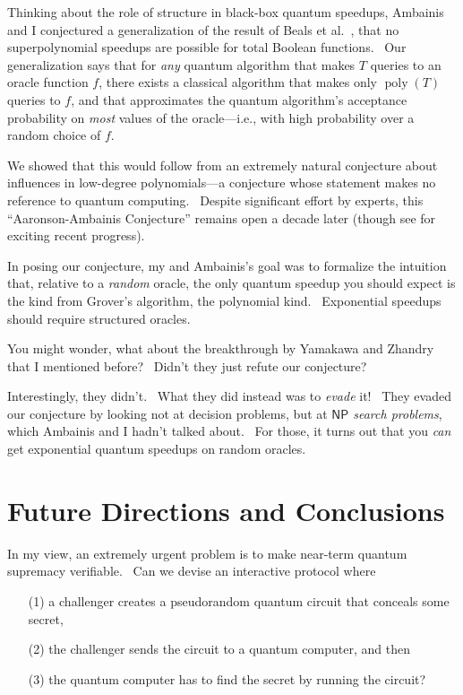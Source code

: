 \documentclass[11pt]{article}
\begin{document}
Thinking about the role of structure in black-box quantum speedups, Ambainis and I \cite{aa:struc} conjectured a generalization of the result of Beals et al.\ \cite{bbcmw}, that no superpolynomial speedups are possible for total Boolean functions. \ Our generalization says that for \emph{any} quantum algorithm that makes $T$ queries to an oracle function $f$, there exists a classical algorithm that makes only $\operatorname{poly}(T)$ queries to $f$, and that approximates the quantum algorithm's acceptance probability on \emph{most} values of the oracle---i.e., with high probability over a random choice of $f$.

We showed that this would follow from an extremely natural conjecture about influences in low-degree polynomials---a conjecture whose statement makes no reference to quantum computing. \ Despite significant effort by experts, this ``Aaronson-Ambainis Conjecture'' remains open a decade later (though see \cite{bsw} for exciting recent progress).

In posing our conjecture, my and Ambainis's goal was to formalize the intuition that, relative to a \emph{random} oracle, the only quantum speedup you should expect is the kind from Grover's algorithm, the polynomial kind. \ Exponential speedups should require structured oracles.

You might wonder, what about the breakthrough by Yamakawa and Zhandry \cite{yz} that I mentioned before? \ Didn't they just refute our conjecture?

Interestingly, they didn't. \ What they did instead was to \emph{evade} it! \ They evaded our conjecture by looking not at decision problems, but at \emph{$\mathsf{NP}$ search problems}, which Ambainis and I hadn't talked about. \ For those, it turns out that you \emph{can} get exponential quantum speedups on random oracles.


\section{Future Directions and Conclusions}

In my view, an extremely urgent problem is to make near-term quantum supremacy verifiable. \ Can we devise an interactive protocol where

\begin{enumerate}
\item[(1)] a challenger creates a pseudorandom quantum circuit that conceals some secret,
\item[(2)] the challenger sends the circuit to a quantum computer, and then
\item[(3)] the quantum computer has to find the secret by running the circuit?
\end{enumerate}
\end{document}
